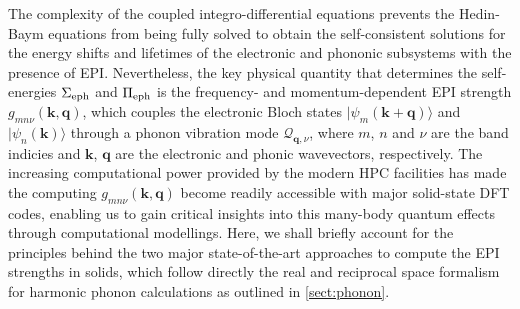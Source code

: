 The complexity of the coupled integro-differential equations prevents the Hedin-Baym equations from being fully solved to obtain the self-consistent solutions for the energy shifts and lifetimes of the electronic and phononic subsystems with the presence of EPI. Nevertheless, the key physical quantity that determines the self-energies $\Sigma_{\mbox{\scriptsize{eph}}}$ and $\Pi_{\mbox{\scriptsize{eph}}}$ is the frequency- and momentum-dependent EPI strength $g_{mn\nu}(\bm{k},\bm{q})$, which couples the electronic Bloch states $|\psi_{m}(\bm{k}+\bm{q})\rangle$ and $|\psi_{n}(\bm{k})\rangle$ through a phonon vibration mode $\bm{\mathcal{Q}}_{\bm{q},\nu}$, where $m$, $n$ and $\nu$ are the band indicies and $\bm{k}$, $\bm{q}$ are the electronic and phonic wavevectors, respectively. The increasing computational power provided by the modern HPC facilities has made the computing $g_{mn\nu}(\bm{k},\bm{q})$ become readily accessible with major solid-state DFT codes,\cite{noffsinger2010epw,ponce2016epw,karsai2018electron} enabling us to gain critical insights into this many-body quantum effects through computational modellings. Here, we shall briefly account for the principles behind the two major state-of-the-art approaches to compute the EPI strengths in solids, which  follow directly  the real and reciprocal space formalism for harmonic phonon calculations as outlined in \cref{sect:phonon}. 

